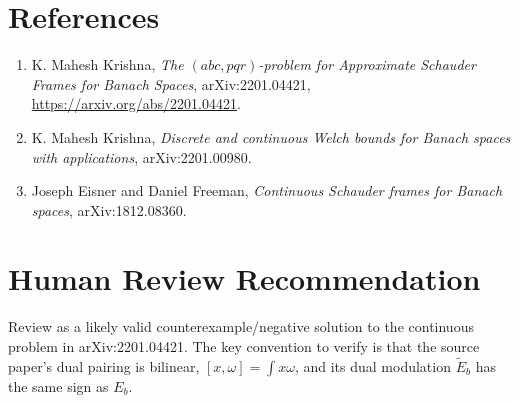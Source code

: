\documentclass[11pt]{article}
\begin{document}
\section*{References}

\begin{enumerate}
\item K. Mahesh Krishna, \emph{The \((abc,pqr)\)-problem for Approximate
Schauder Frames for Banach Spaces}, arXiv:2201.04421,
\url{https://arxiv.org/abs/2201.04421}.
\item K. Mahesh Krishna, \emph{Discrete and continuous Welch bounds for Banach
spaces with applications}, arXiv:2201.00980.
\item Joseph Eisner and Daniel Freeman, \emph{Continuous Schauder frames for
Banach spaces}, arXiv:1812.08360.
\end{enumerate}

\section*{Human Review Recommendation}

Review as a likely valid counterexample/negative solution to the continuous
problem in arXiv:2201.04421.  The key convention to verify is that the source
paper's dual pairing is bilinear, \([x,\omega]=\int x\omega\), and its dual
modulation \(\widetilde E_b\) has the same sign as \(E_b\).
\end{document}
